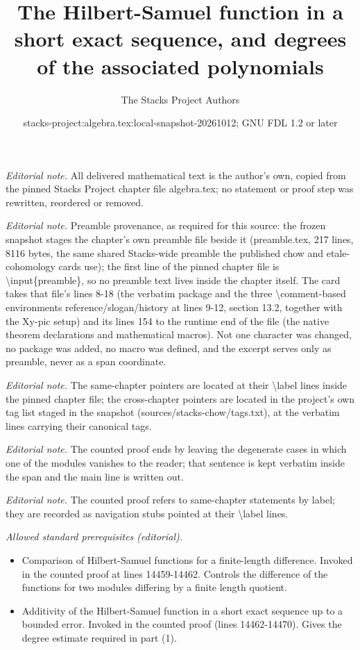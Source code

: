 \documentclass[10pt,a4paper]{amsart}
\title{The Hilbert-Samuel function in a short exact sequence, and degrees of the associated polynomials}
\author{The Stacks Project Authors}
\date{stacks-project:algebra.tex:local-snapshot-20261012; GNU FDL 1.2 or later}
\theoremstyle{plain}
\theoremstyle{definition}
\theoremstyle{remark}
\numberwithin{equation}{subsection}
\begin{document}
\maketitle
\noindent\textit{Editorial note.} All delivered mathematical text is the author's own, copied from the pinned Stacks Project chapter file algebra.tex; no statement or proof step was rewritten, reordered or removed.\par\medskip
\noindent\textit{Editorial note.} Preamble provenance, as required for this source: the frozen snapshot stages the chapter's own preamble file beside it (preamble.tex, 217 lines, 8116 bytes, the same shared Stacks-wide preamble the published chow and etale-cohomology cards use); the first line of the pinned chapter file is \textbackslash{}input\{preamble\}, so no preamble text lives inside the chapter itself. The card takes that file's lines 8-18 (the verbatim package and the three \textbackslash{}comment-based environments reference/slogan/history at lines 9-12, section 13.2, together with the Xy-pic setup) and its lines 154 to the runtime end of the file (the native theorem declarations and mathematical macros). Not one character was changed, no package was added, no macro was defined, and the excerpt serves only as preamble, never as a span coordinate.\par\medskip
\noindent\textit{Editorial note.} The same-chapter pointers are located at their \textbackslash{}label lines inside the pinned chapter file; the cross-chapter pointers are located in the project's own tag list staged in the snapshot (sources/stacks-chow/tags.txt), at the verbatim lines carrying their canonical tags.\par\medskip
\noindent\textit{Editorial note.} The counted proof ends by leaving the degenerate cases in which one of the modules vanishes to the reader; that sentence is kept verbatim inside the span and the main line is written out.\par\medskip
\noindent\textit{Editorial note.} The counted proof refers to same-chapter statements by label; they are recorded as navigation stubs pointed at their \textbackslash{}label lines.\par\medskip
\noindent\textit{Allowed standard prerequisites (editorial).}\begin{itemize}
\item Comparison of Hilbert-Samuel functions for a finite-length difference. Invoked in the counted proof at lines 14459-14462. Controls the difference of the functions for two modules differing by a finite length quotient.
\item Additivity of the Hilbert-Samuel function in a short exact sequence up to a bounded error. Invoked in the counted proof (lines 14462-14470). Gives the degree estimate required in part (1).
\end{itemize}\medskip
\end{document}
